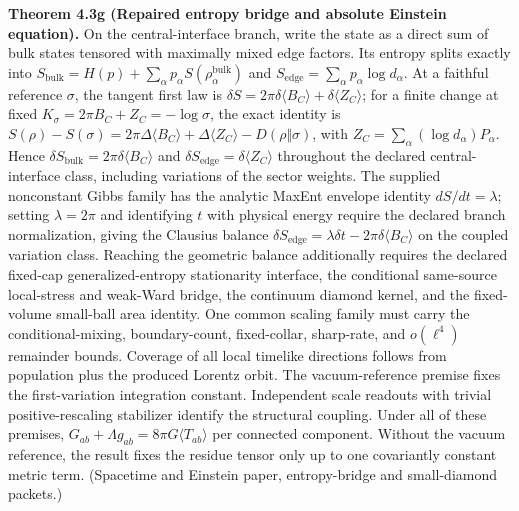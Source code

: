 \textbf{Theorem 4.3g (Repaired entropy bridge and absolute Einstein equation).} On the central-interface branch, write the state as a direct sum of bulk states tensored with maximally mixed edge factors. Its entropy splits exactly into \(S_{\mathrm{bulk}}=H(p)+\sum_\alpha p_\alpha S(\rho_\alpha^{\mathrm{bulk}})\) and \(S_{\mathrm{edge}}=\sum_\alpha p_\alpha\log d_\alpha\). At a faithful reference \(\sigma\), the tangent first law is \(\delta S=2\pi\delta\langle B_C\rangle+\delta\langle Z_C\rangle\); for a finite change at fixed \(K_\sigma=2\pi B_C+Z_C=-\log\sigma\), the exact identity is \(S(\rho)-S(\sigma)=2\pi\Delta\langle B_C\rangle+\Delta\langle Z_C\rangle-D(\rho\Vert\sigma)\), with \(Z_C=\sum_\alpha(\log d_\alpha)P_\alpha\). Hence \(\delta S_{\mathrm{bulk}}=2\pi\delta\langle B_C\rangle\) and \(\delta S_{\mathrm{edge}}=\delta\langle Z_C\rangle\) throughout the declared central-interface class, including variations of the sector weights. The supplied nonconstant Gibbs family has the analytic MaxEnt envelope identity \(dS/dt=\lambda\); setting \(\lambda=2\pi\) and identifying \(t\) with physical energy require the declared branch normalization, giving the Clausius balance \(\delta S_{\mathrm{edge}}=\lambda\delta t-2\pi\delta\langle B_C\rangle\) on the coupled variation class. Reaching the geometric balance additionally requires the declared fixed-cap generalized-entropy stationarity interface, the conditional same-source local-stress and weak-Ward bridge, the continuum diamond kernel, and the fixed-volume small-ball area identity. One common scaling family must carry the conditional-mixing, boundary-count, fixed-collar, sharp-rate, and \(o(\ell^4)\) remainder bounds. Coverage of all local timelike directions follows from population plus the produced Lorentz orbit. The vacuum-reference premise fixes the first-variation integration constant. Independent scale readouts with trivial positive-rescaling stabilizer identify the structural coupling. Under all of these premises, \(G_{ab}+\Lambda g_{ab}=8\pi G\langle T_{ab}\rangle\) per connected component. Without the vacuum reference, the result fixes the residue tensor only up to one covariantly constant metric term. (Spacetime and Einstein paper, entropy-bridge and small-diamond packets.)

